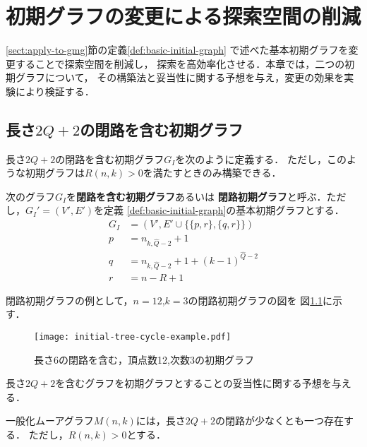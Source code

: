 
\chapter{初期グラフの変更による探索空間の削減}
\label{chap:reduce-by-initial-graph}
\ref{sect:apply-to-gmg}節の定義\ref{def:basic-initial-graph}
で述べた基本初期グラフを変更することで探索空間を削減し，
探索を高効率化させる．本章では，二つの初期グラフについて，
その構築法と妥当性に関する予想を与え，変更の効果を実験により検証する．

\section{長さ$2Q+2$の閉路を含む初期グラフ}
\label{sect:initial-graph-cycle}
長さ$2Q+2$の閉路を含む初期グラフ$G_I$を次のように定義する．
ただし，このような初期グラフは$R(n,k)>0$を満たすときのみ構築できる．
\begin{definition}[長さ$2Q+2$の閉路を含む初期グラフ]
  \label{def:cycle-initial-graph}
  次のグラフ$G_I$を\textbf{閉路を含む初期グラフ}あるいは
  \textbf{閉路初期グラフ}と呼ぶ．ただし，$G_I'=(V',E')$を定義
  \ref{def:basic-initial-graph}の基本初期グラフとする．
  \begin{equation}
    \begin{aligned}
      G_I&=(V',E'\cup\{\{p,r\},\{q,r\}\}) \\
      p&=n_{k,\hat{Q}-2}+1 \\
      q&=n_{k,\hat{Q}-2}+1+(k-1)^{\hat{Q}-2} \\
      r&=n-R+1
    \end{aligned}
  \end{equation}
\end{definition}
閉路初期グラフの例として，$n=12$,$k=3$の閉路初期グラフの図を
図\ref{fig:initial-graph-cycle-example}に示す．

\begin{figure}
  \centering
  \texttt{[image: initial-tree-cycle-example.pdf]}
  \caption{長さ6の閉路を含む，頂点数12,次数3の初期グラフ}
  \label{fig:initial-graph-cycle-example}
\end{figure}

長さ$2Q+2$を含むグラフを初期グラフとすることの妥当性に関する予想を与える．
\begin{conjecture}
  \label{conj:gmg-cycle}
  一般化ムーアグラフ$M(n,k)$には，長さ$2Q+2$の閉路が少なくとも一つ存在する．
  ただし，$R(n,k)>0$とする．
\end{conjecture}


